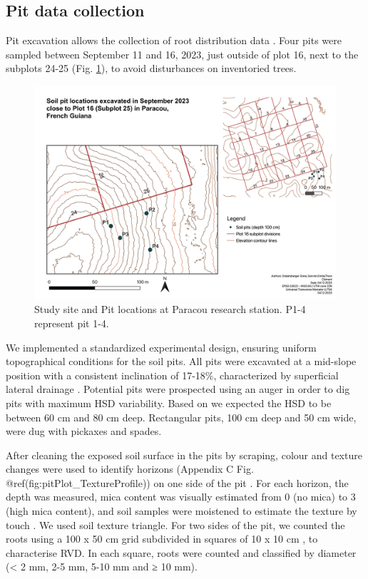 \documentclass[fleqn,12pt]{latex/stylish_article} %
\begin{document}
\hypertarget{pit-data-collection}{%
\subsection{Pit data collection}\label{pit-data-collection}}

Pit excavation allows the collection of root distribution data \citep{freschetStartingGuideRoot2021}. Four pits were sampled between September 11 and 16, 2023, just outside of plot 16, next to the subplots 24-25 (Fig. \ref{fig:Pitlocations2}), to avoid disturbances on inventoried trees.



\scriptsize

\begin{figure}

{\centering \includegraphics[width=0.72\linewidth]{images/Pitlocations2} 

}

\caption{Study site and Pit locations at Paracou research station. P1-4 represent pit 1-4.}\label{fig:Pitlocations2}
\end{figure}

\normalsize

We implemented a standardized experimental design, ensuring uniform topographical conditions for the soil pits. All pits were excavated at a mid-slope position with a consistent inclination of 17-18\%, characterized by superficial lateral drainage . Potential pits were prospected using an auger in order to dig pits with maximum HSD variability. Based on \citep{epronSpatialVariationSoil2006} we expected the HSD to be between 60 cm and 80 cm deep. Rectangular pits, 100 cm deep and 50 cm wide, were dug with pickaxes and spades.

After cleaning the exposed soil surface in the pits by scraping, colour and texture changes were used to identify horizons (Appendix C Fig. @ref(fig:pitPlot\_TextureProfile)) on one side of the pit \citep{ferryGeneseFonctionnementHydrique2003}. For each horizon, the depth was measured, mica content was visually estimated from 0 (no mica) to 3 (high mica content), and soil samples were moistened to estimate the texture by touch \citep{jahnGuidelinesSoilDescription2006}. We used \citet{jamagneSoilMappingVital1977} soil texture triangle. For two sides of the pit, we counted the roots using a 100 x 50 cm grid subdivided in squares of 10 x 10 cm \citep{freschetStartingGuideRoot2021}, to characterise RVD. In each square, roots were counted and classified by diameter (\textless{} 2 mm, 2-5 mm, 5-10 mm and ≥ 10 mm).
\end{document}
